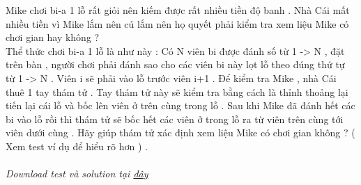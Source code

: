 Mike chơi bi-a 1 lỗ rất giỏi nên kiếm được rất nhiều tiền độ banh . Nhà Cái mất nhiều tiền vì Mike lắm nên cú lắm nên họ quyết phải kiểm tra xem liệu Mike có chơi gian hay không ?   
\\   Thể thức chơi bi-a 1 lỗ là như này : Có N viên bi được đánh số từ 1 -> N , đặt trên bàn , người chơi phải đánh sao cho các viên bi này lọt lỗ theo đúng thứ tự từ 1 -> N . Viên i sẽ phải vào lỗ trước viên i+1 . Để kiểm tra Mike , nhà Cái thuê 1 tay thám tử . Tay thám tử này sẽ kiểm tra bằng cách là thỉnh thoảng lại tiến lại cái lỗ và bốc lên viên ở trên cùng trong lỗ . Sau khi Mike đã đánh hết các bi vào lỗ rồi thì thám tử sẽ bốc hết các viên ở trong lỗ ra từ viên trên cùng tới viên dưới cùng . Hãy giúp thám tử xác định xem liệu Mike có chơi gian không ? ( Xem test ví dụ để hiểu rõ hơn ) .   
\\
\\\textit{    Download test và solution tại    \href{https://vn.spoj.pl/content/cheat.zip}{     đây    }}